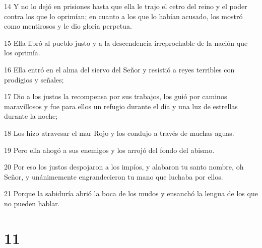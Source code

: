 \par 14 Y no lo dejó en prisiones hasta que ella le trajo el cetro del reino y el poder contra los que lo oprimían; en cuanto a los que lo habían acusado, los mostró como mentirosos y le dio gloria perpetua.
\par 15 Ella libró al pueblo justo y a la descendencia irreprochable de la nación que los oprimía.
\par 16 Ella entró en el alma del siervo del Señor y resistió a reyes terribles con prodigios y señales;
\par 17 Dio a los justos la recompensa por sus trabajos, los guió por caminos maravillosos y fue para ellos un refugio durante el día y una luz de estrellas durante la noche;
\par 18 Los hizo atravesar el mar Rojo y los condujo a través de muchas aguas.
\par 19 Pero ella ahogó a sus enemigos y los arrojó del fondo del abismo.
\par 20 Por eso los justos despojaron a los impíos, y alabaron tu santo nombre, oh Señor, y unánimemente engrandecieron tu mano que luchaba por ellos.
\par 21 Porque la sabiduría abrió la boca de los mudos y ensanchó la lengua de los que no pueden hablar.

\chapter{11}

